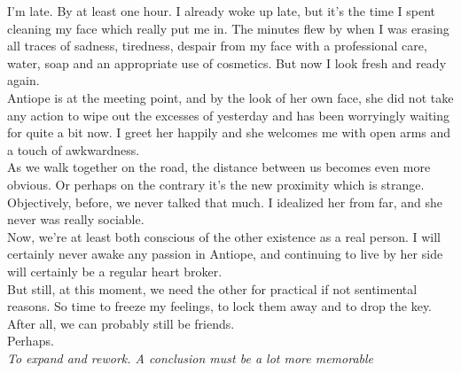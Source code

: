 \documentclass{report}
\newcommand{\dcomment}[1]{
	\emph{#1}
	\\
}
\begin{document}
I'm late. By at least one hour. I already woke up late, but it's the time I spent cleaning my face which really put me in. The minutes flew by when I was erasing all traces of sadness, tiredness, despair from my face with a professional care, water, soap and an appropriate use of cosmetics. But now I look fresh and ready again.\\

Antiope is at the meeting point, and by the look of her own face, she did not take any action to wipe out the excesses of yesterday and has been worryingly waiting for quite a bit now. I greet her happily and she welcomes me with open arms and a touch of awkwardness.\\

As we walk together on the road, the distance between us becomes even more obvious. Or perhaps on the contrary it's the new proximity which is strange. Objectively, before, we never talked that much. I idealized her from far, and she never was really sociable.\\

Now, we're at least both conscious of the other existence as a real person. I will certainly never awake any passion in Antiope, and continuing to live by her side will certainly be a regular heart broker.\\

But still, at this moment, we need the other for practical if not sentimental reasons. So time to freeze my feelings, to lock them away and to drop the key.\\

After all, we can probably still be friends.\\

Perhaps.\\

\dcomment{
	To expand and rework. A conclusion must be a lot more memorable
}
\end{document}
